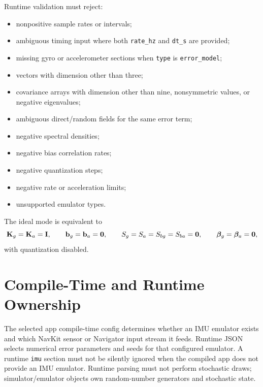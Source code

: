 Runtime validation must reject:
\begin{itemize}
    \item nonpositive sample rates or intervals;
    \item ambiguous timing input where both \texttt{rate\_hz} and
    \texttt{dt\_s} are provided;
    \item missing gyro or accelerometer sections when \texttt{type} is
    \texttt{error\_model};
    \item vectors with dimension other than three;
    \item covariance arrays with dimension other than nine, nonsymmetric
    values, or negative eigenvalues;
    \item ambiguous direct/random fields for the same error term;
    \item negative spectral densities;
    \item negative bias correlation rates;
    \item negative quantization steps;
    \item negative rate or acceleration limits;
    \item unsupported emulator types.
\end{itemize}

The ideal mode is equivalent to
\begin{equation}
\mathbf{K}_g=\mathbf{K}_a=\mathbf{I},
\qquad
\mathbf{b}_g=\mathbf{b}_a=\mathbf{0},
\qquad
S_g=S_a=S_{bg}=S_{ba}=\mathbf{0},
\qquad
\boldsymbol{\beta}_g=\boldsymbol{\beta}_a=\mathbf{0},
\end{equation}
with quantization disabled.

\section{Compile-Time and Runtime Ownership}

The selected app compile-time config determines whether an IMU emulator exists
and which NavKit sensor or Navigator input stream it feeds. Runtime JSON
selects numerical error parameters and seeds for that configured emulator. A
runtime \texttt{imu} section must not be silently ignored when the compiled app
does not provide an IMU emulator. Runtime parsing must not perform stochastic
draws; simulator/emulator objects own random-number generators and stochastic
state.
